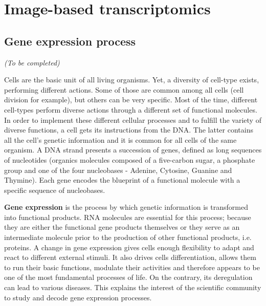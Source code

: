 
\graphicspath{{./figures/introduction/}}

\chapter{Image-based transcriptomics}
\label{ch:introduction}

\minitoc
\newpage

\section{Gene expression process}
\label{sec:gene_expression}

\begin{center}
	\textit{(To be completed)}
\end{center}

Cells are the basic unit of all living organisms.
Yet, a diversity of cell-type exists, performing different actions.
Some of those are common among all cells (cell division for example), but others can be very specific.
Most of the time, different cell-types perform diverse actions through a different set of functional molecules.
In order to implement these different cellular processes and to fulfill the variety of diverse functions, a cell gets its instructions from the \ac{DNA}.
The latter contains all the cell's genetic information and it is common for all cells of the same organism.
A \ac{DNA} strand presents a succession of genes, defined as long sequences of nucleotides (organics molecules composed of a five-carbon sugar, a phosphate group and one of the four nucleobases - Adenine, Cytosine, Guanine and Thymine).
Each gene encodes the blueprint of a functional molecule with a specific sequence of nucleobases.

\textbf{Gene expression} is the process by which genetic information is transformed into functional products.
RNA molecules are essential for this process; because they are either the functional gene products themselves or they serve as an intermediate molecule prior to the production of other functional products, i.e. proteins.
A change in gene expression gives cells enough flexibility to adapt and react to different external stimuli.
It also drives cells differentiation, allows them to run their basic functions, modulate their activities and therefore appears to be one of the most fundamental processes of life.
On the contrary, its deregulation can lead to various diseases.
This explains the interest of the scientific community to study and decode gene expression processes.

